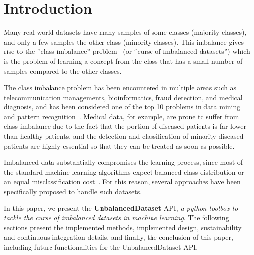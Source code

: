 \documentclass[twoside,11pt]{article}
\begin{document}
\section{Introduction}

Many real world datasets have many samples of some classes (majority classes),
and only a few samples the other class (minority classes). This imbalance gives
rise to the ``class imbalance'' problem~\cite{prati2009data} (or ``curse of imbalanced datasets'')
which is the problem of learning a concept from the class that has a small number of samples compared
to the other classes. 

The class imbalance problem has been encountered in multiple areas such as 
telecommunication managements, bioinformatics, fraud detection, and medical diagnosis,
and has been considered one of the top 10 problems in data mining and 
pattern recognition~\cite{10problemsInDM:2006}. 
Medical data, for example, are prone to suffer from class imbalance due to the fact 
that the portion of diseased patients is far lower than healthy patients,
and the detection and classification of minority diseased patients are highly essential
so that they can be treated as soon as possible.

Imbalanced data substantially compromises the learning process, since most of the 
standard machine learning algorithms expect balanced class distribution or an 
equal misclassification cost~\cite{he2009learning}. For this reason, several
approaches have been specifically proposed to handle such datasets.

In this paper, we present the \textbf{UnbalancedDataset} API, 
\textit{a python toolbox to tackle the curse of imbalanced datasets
in machine learning}. The following sections present the implemented
methods, implemented design, sustainability and continuous integration details,
and finally, the conclusion of this paper, including future functionalities
for the UnbalancedDataset API.

\end{document}
